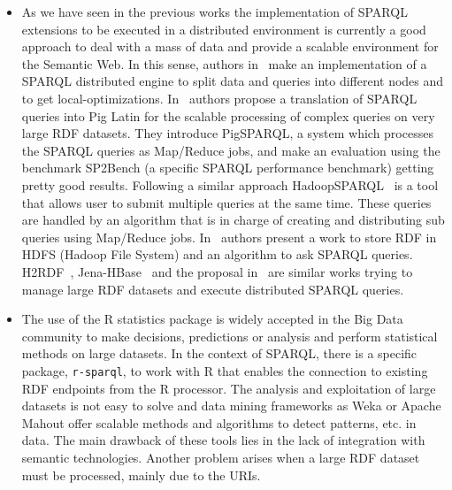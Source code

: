 \begin{itemize}
\item As we have seen in the previous works the implementation of SPARQL 
extensions to be executed in a distributed environment is currently a good 
approach to deal with a mass of data and provide a scalable environment for the 
Semantic Web. In this sense, authors in~\cite{DBLP:journals/pvldb/HuangAR11} make an implementation of a SPARQL 
distributed engine to split data and queries into different nodes and to get 
local-optimizations. In~\cite{Schatzle:2011:PMS:1999299.1999303} authors propose a translation of SPARQL queries 
into Pig Latin for the scalable processing of complex queries on very large RDF 
datasets. They introduce PigSPARQL, a system which processes the SPARQL queries 
as Map/Reduce jobs, and make an evaluation using the benchmark SP2Bench (a specific SPARQL performance benchmark) getting pretty good results. 
Following a similar approach HadoopSPARQL~\cite{liuhadoopsparql} is a tool that allows user to submit multiple queries 
at the same time. These queries are handled by an algorithm that is in charge of creating and distributing sub queries 
using Map/Reduce jobs. In~\cite{FarhanHusain:2009:SRL:1695659.1695734} authors present a work to store RDF in HDFS (Hadoop File System) 
and an algorithm to ask SPARQL queries. H2RDF~\cite{Papailiou:2012:HAQ:2187980.2188058}, Jena-HBase~\cite{DBLP:conf/semweb/KhadilkarKTC12} 
and the proposal in~\cite{maindonald2007data} are similar works trying to manage large RDF datasets and execute distributed SPARQL queries. 

\item The use of the R statistics package is widely accepted in the Big 
Data community to make decisions, predictions or analysis and perform statistical methods on large datasets. In 
the context of SPARQL, there is a specific package, \texttt{r-sparql}, to work with R that enables the 
connection to existing RDF endpoints from the R processor. The analysis and exploitation of large datasets is not easy to solve and data 
mining frameworks as Weka or Apache Mahout offer scalable methods and algorithms 
to detect patterns, etc. in data. The main drawback of these tools lies in the 
lack of integration with semantic technologies. Another problem arises when a 
large RDF dataset must be processed, mainly due to the URIs. 



\end{itemize}
